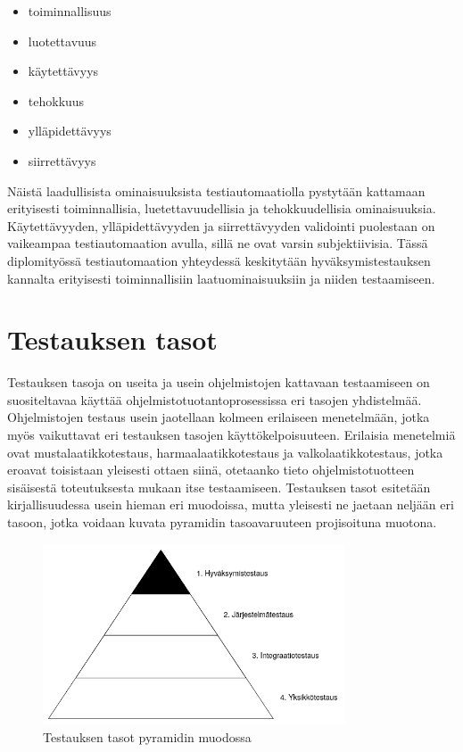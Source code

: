   \begin{itemize}
    \item toiminnallisuus
    \item luotettavuus
    \item käytettävyys
    \item tehokkuus
    \item ylläpidettävyys
    \item siirrettävyys
  \end{itemize}

  Näistä laadullisista ominaisuuksista testiautomaatiolla pystytään kattamaan erityisesti toiminnallisia, luetettavuudellisia ja tehokkuudellisia ominaisuuksia.
  Käytettävyyden, ylläpidettävyyden ja siirrettävyyden validointi puolestaan on vaikeampaa testiautomaation avulla, sillä ne ovat varsin subjektiivisia.
  Tässä diplomityössä testiautomaation yhteydessä keskitytään hyväksymistestauksen kannalta erityisesti toiminnallisiin laatuominaisuuksiin ja niiden testaamiseen.

\section{Testauksen tasot} \label{ch:07_testauksen_tasot}

  Testauksen tasoja on useita ja usein ohjelmistojen kattavaan testaamiseen on suositeltavaa käyttää ohjelmistotuotantoprosessissa eri tasojen yhdistelmää.
  Ohjelmistojen testaus usein jaotellaan kolmeen erilaiseen menetelmään, jotka myös vaikuttavat eri testauksen tasojen käyttökelpoisuuteen.
  Erilaisia menetelmiä ovat mustalaatikkotestaus, harmaalaatikkotestaus ja valkolaatikkotestaus, jotka eroavat toisistaan yleisesti ottaen siinä, otetaanko tieto ohjelmistotuotteen sisäisestä toteutuksesta mukaan itse testaamiseen.
  Testauksen tasot esitetään kirjallisuudessa usein hieman eri muodoissa, mutta yleisesti ne jaetaan neljään eri tasoon, jotka voidaan kuvata pyramidin tasoavaruuteen projisoituna muotona.

  \begin{figure}[H]
    \centering
    \includegraphics[width=0.8\textwidth]{assets/testauksen-tasot.png}
    \caption{Testauksen tasot pyramidin muodossa}
    \label{fig:testing-levels-pyramid}
  \end{figure}

